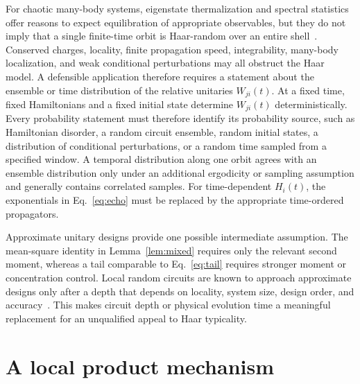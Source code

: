 \documentclass[aps,pra,reprint,superscriptaddress,nofootinbib,longbibliography]{revtex4-2}
\begin{document}
For chaotic many-body systems, eigenstate thermalization and spectral
statistics offer reasons to expect equilibration of appropriate observables,
but they do not imply that a single finite-time orbit is Haar-random over an
entire shell~\cite{rigol2008thermalization,dalessio2016quantum}.  Conserved
charges, locality, finite propagation speed, integrability, many-body
localization, and weak conditional perturbations may all obstruct the Haar
model.  A defensible application therefore requires a statement about the
ensemble or time distribution of the relative unitaries $W_{ji}(t)$.
At a fixed time, fixed Hamiltonians and a fixed initial state determine
$W_{ji}(t)$ deterministically.  Every probability statement must therefore
identify its probability source, such as Hamiltonian disorder, a random
circuit ensemble, random initial states, a distribution of conditional
perturbations, or a random time sampled from a specified window.  A temporal
distribution along one orbit agrees with an ensemble distribution only under
an additional ergodicity or sampling assumption and generally contains
correlated samples.  For time-dependent $H_i(t)$, the exponentials in
Eq.~\eqref{eq:echo} must be replaced by the appropriate time-ordered
propagators.

Approximate unitary designs provide one possible intermediate assumption.
The mean-square identity in Lemma~\ref{lem:mixed} requires only the relevant
second moment, whereas a tail comparable to Eq.~\eqref{eq:tail} requires
stronger moment or concentration control.  Local random circuits are known to
approach approximate designs only after a depth that depends on locality,
system size, design order, and accuracy~\cite{brandao2016local}.  This makes
circuit depth or physical evolution time a meaningful replacement for an
unqualified appeal to Haar typicality.

\section{A local product mechanism}
\label{sec:local-product}
\end{document}
